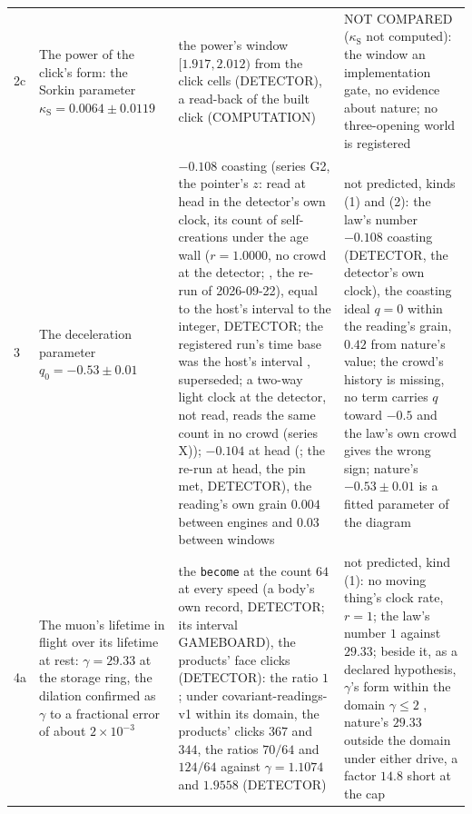 {\begin{longtable}{L{0.3in}L{2.0in}L{1.5in}L{2.2in}}
2c & The power of the click's form: the Sorkin parameter $\kappa_{\mathrm S} = 0.0064 \pm 0.0119$ \cite{sinha2010} & the power's window $[1.917, 2.012)$ from the click cells (DETECTOR), a read-back of the built click (COMPUTATION) & NOT COMPARED ($\kappa_{\mathrm S}$ not computed): the window an implementation gate, no evidence about nature; no three-opening world is registered \\
3 & The deceleration parameter $q_0 = -0.53 \pm 0.01$ \cite{planck2018,riess1998,perlmutter1999} & $-0.108$ coasting (series G2, the pointer's $z$: read at head in the detector's own clock, its count of self-creations under the age wall ($r = 1.0000$, no crowd at the detector; \cite{criteria}, the re-run of 2026-09-22), equal to the host's interval to the integer, DETECTOR; the registered run's time base was the host's interval \cite[record 768]{log}, superseded; a two-way light clock at the detector, not read, reads the same count in no crowd (series X)); $-0.104$ at head (\cite[record 408]{log}; the re-run at head, the pin met, DETECTOR), the reading's own grain $0.004$ between engines and $0.03$ between windows & not predicted, kinds (1) and (2): the law's number $-0.108$ coasting (DETECTOR, the detector's own clock), the coasting ideal $q = 0$ within the reading's grain, $0.42$ from nature's value; the crowd's history is missing, no term carries $q$ toward $-0.5$ and the law's own crowd gives the wrong sign; nature's $-0.53 \pm 0.01$ is a fitted parameter of the diagram \\
4a & The muon's lifetime in flight over its lifetime at rest: $\gamma = 29.33$ at the storage ring, the dilation confirmed as $\gamma$ to a fractional error of about $2 \times 10^{-3}$ \cite{bailey1977} & the \texttt{become} at the count $64$ at every speed (a body's own record, DETECTOR; its interval GAMEBOARD), the products' face clicks (DETECTOR): the ratio $1$; under covariant-readings-v1 within its domain, the products' clicks $367$ and $344$, the ratios $70/64$ and $124/64$ against $\gamma = 1.1074$ and $1.9558$ (DETECTOR) \cite{run4ab} & not predicted, kind (1): no moving thing's clock rate, $r = 1$; the law's number $1$ against $29.33$; beside it, as a declared hypothesis, $\gamma$'s form within the domain $\gamma \le 2$ \cite{run4ab}, nature's $29.33$ outside the domain under either drive, a factor $14.8$ short at the cap \\

\end{longtable}}
